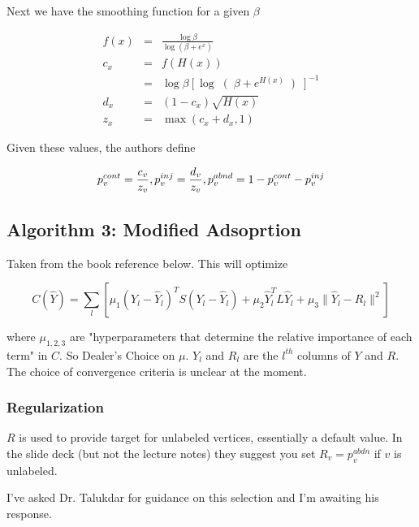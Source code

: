 \documentclass{article}
\begin{document}
Next we have the smoothing function for a given $\beta$

\begin{eqnarray}
f(x) &=& \frac{\log \beta}{\log(\beta + e^{x})} \\ 
c_x &=& f(H(x)) \\
&=& \log \beta \left[ \log \right( \beta + e^{H(x)} \left)\right]^{-1} \\
d_x &=& (1-c_x) \sqrt{H(x)} \\
z_x &=& \max( c_x + d_x, 1)
\end{eqnarray}

Given these values, the authors define

\[
p_v^{cont} = \frac{c_v}{z_v}, \vspace{1mm} p_v^{inj} = \frac{d_v}{z_v}, \vspace{1mm} p_v^{abnd} = 1-p_v^{cont}  - p_v^{inj}
\]

\subsection{Algorithm 3: Modified Adsoprtion}

Taken from the book reference below.  This will optimize

\[
C(\hat Y) = \sum_l \left [ \mu_1 \left(Y_l - \hat Y_l \right)^T S\left(Y_l -\hat Y_l\right) + \mu_2 \hat Y_l^T L \hat Y_l + \mu_3 \| \hat Y_l - R_l \|^2 \right]
\]

where $\mu_{1,2,3}$ are "hyperparameters that determine the relative importance of each term" in $C$.  So Dealer's Choice on $\mu$. $Y_l$ and $R_l$ are the $l^{th}$ columns of $Y$ and $R$.   The choice of convergence criteria is unclear at the moment. 

\subsubsection{Regularization}

$R$ is used to provide target for unlabeled vertices, essentially a default value.  In the slide deck (but not the lecture notes) they suggest you set $R_v = p_v^{abdn}$ if $v$ is unlabeled.

I've asked Dr. Talukdar for guidance on this selection and I'm awaiting his response. 
\end{document}

